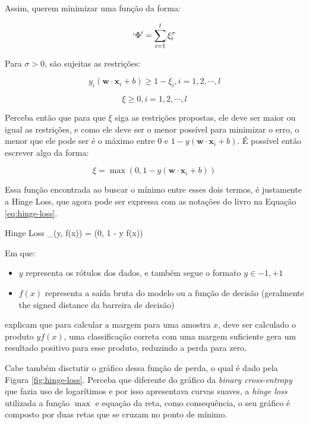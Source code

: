 Assim, \textcite{HingeLoss} querem minimizar uma função da forma:

\[
    `\Phi ' = \sum_{i = 1}^l \xi_i^{\sigma}
\]

Para $\sigma > 0$, são sujeitas as restrições:

\[
    y_i (\textbf{w} \cdot \textbf{x}_i + b) \ge 1 - \xi_i, i = 1, 2, \cdots, l
\]

\[
    \xi \ge 0, i = 1, 2, \cdots, l
\]

Perceba então que para que $\xi$ siga as restrições propostas, ele deve ser maior ou igual as restrições, e como ele deve ser o menor possível para minimizar o erro, o menor que ele pode ser é o máximo entre 0 e $1 - y(\textbf{w} \cdot \textbf{x}_i + b)$. É possível então escrever algo da forma:

\[
    \xi = \max (0, 1 - y(\textbf{w} \cdot \textbf{x}_i + b))
\]

Essa função encontrada ao buscar o mínimo entre esses dois termos, é justamente a Hinge Loss, que agora pode ser expressa com as notações do livro na Equação \ref{eq:hinge-loss}.

\begin{equacaodestaque}{Hinge Loss}
    \Loss_{}(y, f(x)) = \max(0, 1 - y \cdot f(x))
    \label{eq:hinge-loss}
\end{equacaodestaque}

Em que:

\begin{itemize}
    \item $y$ representa os rótulos dos dados, e também segue o formato $y \in {-1, +1}$
    \item $f(x)$ representa a saída bruta do modelo ou a função de decisão (geralmente the signed distance da barreira de decisão)
\end{itemize}

\textcite{LossesArticle} explicam que para calcular a margem para uma amostra $x$, deve ser calculado o produto $yf(x)$, uma classificação correta com uma margem suficiente gera um resultado positivo para esse produto, reduzindo a perda para zero.

Cabe também disctutir o gráfico dessa função de perda, o qual é dado pela Figura \ref{fig:hinge-loss}. Perceba que diferente do gráfico da \textit{binary cross-entropy} que fazia uso de logarítimos e por isso apresentava curvas suaves, a \textit{hinge loss} utilizada a função $\max$ e equação da reta, como consequência, o seu gráfico é composto por duas retas que se cruzam no ponto de mínimo.

